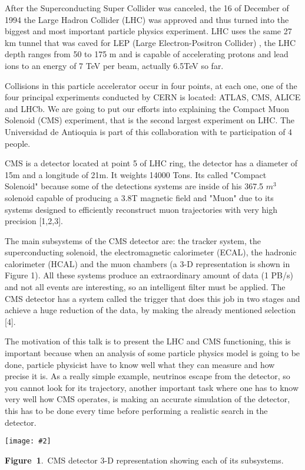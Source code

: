 \documentclass[a4paper,11pt]{article}
\newcommand{\abstracttext}[1]{
 \vspace*{-0.3cm}
 \columnsep0.75cm
 \begin{multicols}{2} #1 \end{multicols}
}
\newcommand{\picturelandscape}[2]{
 \vspace*{0.5cm}
 \centerline{
  \texttt{[image: \#2]}
 }
}
\newcommand{\capt}[2]{
 \vspace*{-0.3cm}
 \begin{center}
 \begin{minipage}[t]{7.8cm} {\small {\bf Figure~#1}.~#2} \end{minipage}
 \end{center}
 \vspace*{0.3cm}
}
\begin{document}
\abstracttext{ After the Superconducting Super Collider was canceled, the 16 of December of 1994 the Large Hadron Collider (LHC) was approved and thus turned into the biggest and most important particle physics experiment. LHC uses the same 27 km tunnel that was caved for LEP (Large Electron-Positron Collider) , the LHC depth ranges from 50 to 175 m and is capable of accelerating protons and lead ions to an energy of 7 TeV per beam, actually 6.5TeV so far.
	
	Collisions in this particle accelerator occur in four points, at each one, one of the four principal experiments conducted by CERN is located: ATLAS, CMS, ALICE and LHCb. We are going to put our efforts into explaining the Compact Muon Solenoid (CMS) experiment, that is the second largest experiment on LHC. The Universidad de Antioquia is part of this collaboration with te participation of  4 people.
	
	CMS is a detector located at point 5 of LHC ring, the detector has a diameter of 15m and a longitude of 21m. It weights 14000 Tons. Its called "Compact Solenoid" because some of the detections systems are inside of his 367.5 $m^3$ solenoid capable of producing a 3.8T magnetic field and "Muon" due to its systems designed to efficiently reconstruct muon trajectories with very high precision [1,2,3].
	
	The main subsystems of the CMS detector are: the tracker system, the superconducting solenoid, the electromagnetic calorimeter (ECAL), the hadronic calorimeter (HCAL) and the muon chambers (a 3-D representation is shown in Figure 1). All these systems produce an extraordinary amount of data (1 PB/s) and not all events are interesting, so an intelligent filter must be applied. The CMS detector has a system called the trigger that does this job in two stages and achieve a huge reduction of the data, by making the already mentioned selection [4].
	
	The motivation of this talk is to present the LHC and CMS functioning, this is important because when an analysis of some particle physics model is going to be done, particle physicist have to know well what they can measure and how precise it is. As a really simple example, neutrinos escape from the detector, so you cannot look for its trajectory, another important task where one has to know very well how CMS operates, is making an accurate simulation of the detector, this has to be done every time before performing a realistic search in the detector.

\picturelandscape{0}{png2pdf.pdf} %
\capt{1}{CMS detector 3-D representation showing each of its subsystems.}



}
\end{document}
